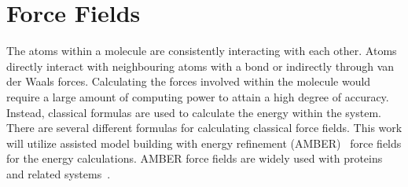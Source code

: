 \section{Force Fields}

The atoms within a molecule are consistently interacting with each other. Atoms directly interact with neighbouring atoms with a bond or indirectly through van der Waals forces. Calculating the forces involved within the molecule would require a large amount of computing power to attain a high degree of accuracy. Instead, classical formulas are used to calculate the energy within the system. There are several different formulas for calculating classical force fields. This work will utilize assisted model building with energy refinement (AMBER)~\cite{cornell1995second} force fields for the energy calculations. AMBER force fields are widely used with proteins and related systems~\cite{ponder2003force}.

